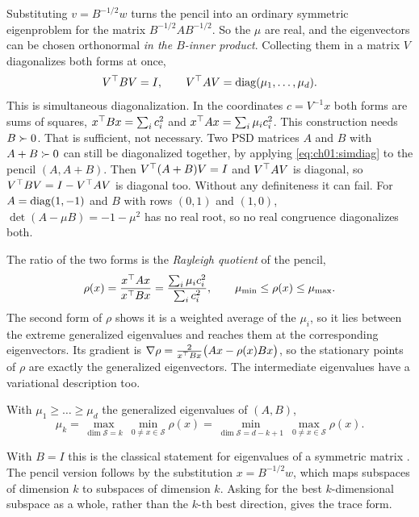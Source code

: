 Substituting $v=B^{-1/2}w$ turns the pencil into an ordinary symmetric
eigenproblem for the matrix $B^{-1/2}AB^{-1/2}$. So the $\mu$ are real, and the
eigenvectors can be chosen orthonormal \emph{in the $B$-inner product}.
Collecting them in a matrix $V$ diagonalizes both forms at once,
\begin{equation}\label{eq:ch01:simdiag}
V^{\top} BV=I,\qquad V^{\top} AV=\operatorname{diag}(\mu_1,\dots,\mu_d).
\end{equation}
This is simultaneous diagonalization. In the coordinates $c=V^{-1}x$ both forms
are sums of squares, $x^{\top} Bx=\sum_ic_i^2$ and $x^{\top} Ax=\sum_i\mu_ic_i^2$. This
construction needs $B\succ0$. That is sufficient, not necessary. Two PSD
matrices $A$ and $B$ with $A+B\succ0$ can still be diagonalized together, by
applying \cref{eq:ch01:simdiag} to the pencil $(A,A+B)$. Then $V^{\top}(A+B)V=I$
and $V^{\top} AV$ is diagonal, so $V^{\top} BV=I-V^{\top} AV$ is diagonal too. Without any
definiteness it can fail. For $A=\operatorname{diag}(1,-1)$ and $B$ with rows $(0,1)$ and
$(1,0)$, $\det(A-\mu B)=-1-\mu^2$ has no real root, so no real congruence
diagonalizes both.

The ratio of the two forms is the \emph{Rayleigh quotient} of the pencil,
\begin{equation}\label{eq:ch01:rayleigh}
\rho(x)=\frac{x^{\top} Ax}{x^{\top} Bx}=\frac{\sum_i\mu_ic_i^2}{\sum_ic_i^2},\qquad
\mu_{\min}\le\rho(x)\le\mu_{\max}.
\end{equation}
The second form of $\rho$ shows it is a weighted average of the $\mu_i$, so it
lies between the extreme generalized eigenvalues and reaches them at the
corresponding eigenvectors. Its gradient is
$\nabla\rho=\tfrac{2}{x^{\top} Bx}\big(Ax-\rho(x)Bx\big)$, so the stationary points
of $\rho$ are exactly the generalized eigenvectors. The intermediate
eigenvalues have a variational description too.

\begin{theorem}\label{thm:ch01:cf}
With $\mu_1\ge\dots\ge\mu_d$ the generalized eigenvalues of $(A,B)$,
\begin{equation}\label{eq:ch01:courant}
\mu_k=\max_{\dim\mathcal S=k}\ \min_{0\neq x\in\mathcal S}\rho(x)
=\min_{\dim\mathcal S=d-k+1}\ \max_{0\neq x\in\mathcal S}\rho(x).
\end{equation}
\end{theorem}

With $B=I$ this is the classical statement for eigenvalues of a symmetric
matrix \cite{hornjohnson2012}. The pencil version follows by the substitution
$x=B^{-1/2}w$, which maps subspaces of dimension $k$ to subspaces of dimension
$k$. Asking for the best $k$-dimensional subspace as a whole, rather than the
$k$-th best direction, gives the trace form.

